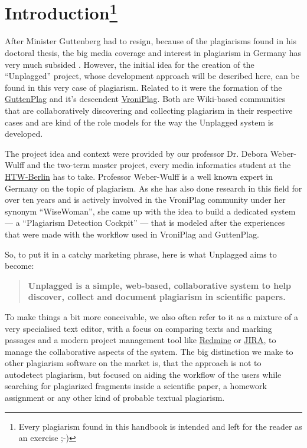 \chapter*{Introduction\footnote{Every plagiarism found in this handbook is intended and left for the reader as an exercise ;-)}}

After Minister Guttenberg had to resign, because of the plagiarisms found in his doctoral thesis,
the big media coverage and interest in plagiarism in Germany has very much subsided 
\citep{Google2012}. However, the initial idea for the 
creation of the \enquote{Unplagged} project, whose development approach will be described here, can be found in this 
very case of plagiarism. Related to it were the formation of the
\href{http://de.guttenplag.wikia.com/wiki/GuttenPlag\_Wiki}{GuttenPlag} and it's descendent 
\href{http://de.vroniplag.wikia.com/wiki/Home}{VroniPlag}. Both are Wiki-based communities that are collaboratively 
discovering and collecting plagiarism in their respective cases and are kind of the role models for the way the
Unplagged system is developed.

The project idea and context were provided by our professor Dr. Debora Weber-Wulff and the two-term master project,
every media informatics student at the \href{http://htw-berlin.de/}{HTW-Berlin} has to take. Professor Weber-Wulff is 
a well known expert in Germany on the topic of plagiarism. As she has also done research in this 
field for over ten years and is actively involved in the VroniPlag community under her 
synonym \enquote{WiseWoman}\citep{Spiegel-Online2011}, she came up with the idea to build a dedicated system --- a 
\enquote{Plagiarism Detection Cockpit}\citep{Weber-Wulff2011} --- 
that is modeled after the experiences that were made with the workflow used in VroniPlag and GuttenPlag.

So, to put it in a catchy marketing phrase, here is what Unplagged aims to become: 

\begin{quote}
\textbf{Unplagged is a simple, web-based, collaborative system to help discover, collect and 
document plagiarism in scientific papers.}
\end{quote}

To make things a bit more conceivable, we also often refer to it as a mixture of a very specialised text editor, with a focus on 
comparing texts and marking 
passages and a modern project management tool like \href{http://www.redmine.org/}{Redmine} or 
\href{http://www.atlassian.com/JIRA}{JIRA}, 
to manage the collaborative aspects of the system. The big distinction we make to other plagiarism software on the market is, 
that the approach is not to autodetect plagiarism, but focused on aiding the workflow of the users while  
searching for plagiarized
fragments inside a scientific paper, a homework assignment or any other kind of probable textual plagiarism.

